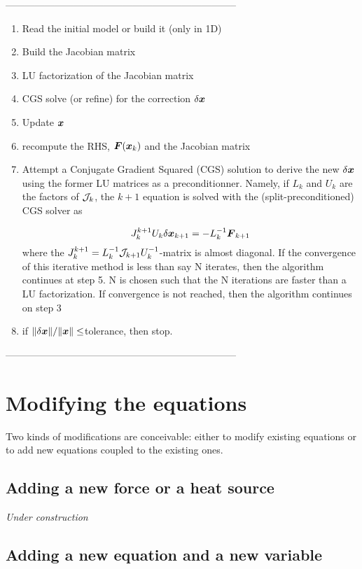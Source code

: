 \noindent -----------------------------------------------------------------------
\begin{enumerate}

\item Read the initial model or build it (only in 1D)
\item Build the Jacobian matrix
\item LU factorization of the Jacobian matrix
\item CGS solve (or refine) for the correction $\delta\vx$
\item Update $\vx$
\item recompute the RHS, $\vF(\vx_k)$ and the Jacobian matrix
\item Attempt a Conjugate Gradient Squared (CGS) solution to derive the new
$\delta\vx$ using the former LU matrices as a preconditionner. Namely,
if $L_k$ and $U_k$ are the factors of $\mathcal{J}_k$, the $k+1$ equation is
solved with the (split-preconditioned) CGS solver as

\[ J_k^{k+1}U_k\delta\vx_{k+1} = -L_k^{-1}\vF_{k+1}  \]
where the $J_k^{k+1}=L_k^{-1}\mathcal{J}_{k+1}U_k^{-1}$-matrix is almost
diagonal. If the convergence of this iterative method is less than say N
iterates, then the algorithm continues at step 5. N is chosen such that
the N iterations are faster than a LU factorization. If convergence is
not reached, then the algorithm continues on step 3

\item if $\|\delta\vx\|/\|\vx\|\leq$tolerance, then stop.
\end{enumerate}
\noindent -----------------------------------------------------------------------

\section{Modifying the equations}

Two kinds of modifications are conceivable: either to modify existing
equations or to add new equations coupled to the existing ones.

\subsection{Adding a new force or a heat source}

{\it Under construction}

\subsection{Adding a new equation and a new variable}

